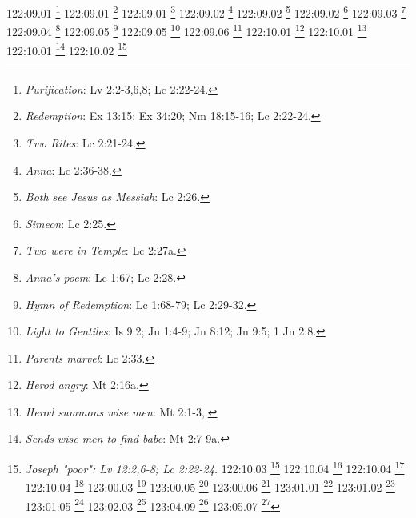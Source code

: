 {{{{{{{{{{{{{{{{{{{{{{{{{{122:09.01 \footnote{\textit{Purification}: Lv 2:2-3,6,8; Lc 2:22-24.}
122:09.01 \footnote{\textit{Redemption}: Ex 13:15; Ex 34:20; Nm 18:15-16; Lc 2:22-24.}
122:09.01 \footnote{\textit{Two Rites}: Lc 2:21-24.}
122:09.02 \footnote{\textit{Anna}: Lc 2:36-38.}
122:09.02 \footnote{\textit{Both see Jesus as Messiah}: Lc 2:26.}
122:09.02 \footnote{\textit{Simeon}: Lc 2:25.}
122:09.03 \footnote{\textit{Two were in Temple}: Lc 2:27a.}
122:09.04 \footnote{\textit{Anna's poem}: Lc 1:67; Lc 2:28.}
122:09.05 \footnote{\textit{Hymn of Redemption}: Lc 1:68-79; Lc 2:29-32.}
122:09.05 \footnote{\textit{Light to Gentiles}: Is 9:2; Jn 1:4-9; Jn 8:12; Jn 9:5; 1 Jn 2:8.}
122:09.06 \footnote{\textit{Parents marvel}: Lc 2:33.}
122:10.01 \footnote{\textit{Herod angry}: Mt 2:16a.}
122:10.01 \footnote{\textit{Herod summons wise men}: Mt 2:1-3,.}
122:10.01 \footnote{\textit{Sends wise men to find babe}: Mt 2:7-9a.}
122:10.02 \footnote{\textit{Joseph "poor": Lv 12:2,6-8; Lc 2:22-24.}
122:10.03 \footnote{\textit{Male babies killed}: Mt 2:16.}
122:10.04 \footnote{\textit{Flight to Egypt}: Mt 2:14.}
122:10.04 \footnote{\textit{Length of stay}: Mt 2:15a,19-21.}
122:10.04 \footnote{\textit{The warning}: Mt 2:13.}
123:00.03 \footnote{\textit{Further delay}: Mt 2:21.}
123:00.05 \footnote{\textit{Nazareth chosen as home}: Mt 2:22-23.}
123:00.06 \footnote{\textit{Going to Nazareth}: Lc 2:39.}
123:01.01 \footnote{\textit{Arriving in Nazareth}: Lc 2:39.}
123:01.02 \footnote{\textit{Jesus' health}: Lc 2:40.}
123:01:05 \footnote{\textit{Jesus' brother, James}: Mt 13:55; Mt 27:56; Mc 6:3; Mc 15:40; Gl 1:19.}
123:02.03 \footnote{\textit{Jesus' sister, Miriam}: Mt 13:56; Mc 6:3.}
123:04.09 \footnote{\textit{Jesus' brother, Joseph}: Mt 13:55; Mt 27:56; Mc 6:3; Mc 15:40.}
123:05.07 \footnote{\textit{Can any good thing come ..: Jn 1:46.}
123:05.11 \footnote{\textit{Spirit of Lord is upon me}: Is 61:1.}
123:05.12 \footnote{\textit{Story of Elijah}: 1 Re 17:1-19:21; 1 Re 21:17-29; 2 Re 1:3-2:11.}
123:06.07 \footnote{\textit{Jesus' brother, Simon}: Mt 13:55; Mc 6:3.}
124:01.07 \footnote{\textit{Jesus' sister, Martha}: Mt 13:56; Mc 6:3.}
124:03.04 \footnote{\textit{Jesus' brother, Jude}: Mt 13:55; Mc 6:3.}
124:04.07 \footnote{\textit{Jesus questions customs}: Dt 6:6-9.}
124:04.07 \footnote{\textit{Lord preserves going out ..: Sal 121:8.}
124:04.09 \footnote{\textit{Be loyal to convictions}: Sal 15:1-5.}
124:04.09 \footnote{\textit{Honor your father & mother}: Ex 20:12.}
124:05:04 \footnote{\textit{Child of the Most High}: Sal 82:6.}
124:06.00 \footnote{\textit{Journey to Jerusalem}: Lc 2:42.}
124:06.15 \footnote{\textit{The hour has come}: Lc 2:49.}
}}}}}}}}}}}}}}}}}}}}}}}}}}}}}
